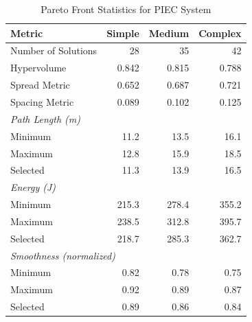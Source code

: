 \begin{table}[htbp]
\centering
\caption{Pareto Front Statistics for PIEC System}
\label{tab:pareto_stats}
\begin{tabular}{@{}lrrr@{}}
\toprule
\textbf{Metric} & \textbf{Simple} & \textbf{Medium} & \textbf{Complex} \\
\midrule
Number of Solutions & 28 & 35 & 42 \\
Hypervolume & 0.842 & 0.815 & 0.788 \\
Spread Metric & 0.652 & 0.687 & 0.721 \\
Spacing Metric & 0.089 & 0.102 & 0.125 \\
\midrule
\multicolumn{4}{l}{\textit{Path Length (m)}} \\
Minimum & 11.2 & 13.5 & 16.1 \\
Maximum & 12.8 & 15.9 & 18.5 \\
Selected & 11.3 & 13.9 & 16.5 \\
\midrule
\multicolumn{4}{l}{\textit{Energy (J)}} \\
Minimum & 215.3 & 278.4 & 355.2 \\
Maximum & 238.5 & 312.8 & 395.7 \\
Selected & 218.7 & 285.3 & 362.7 \\
\midrule
\multicolumn{4}{l}{\textit{Smoothness (normalized)}} \\
Minimum & 0.82 & 0.78 & 0.75 \\
Maximum & 0.92 & 0.89 & 0.87 \\
Selected & 0.89 & 0.86 & 0.84 \\
\bottomrule
\end{tabular}
\end{table}

\clearpage
